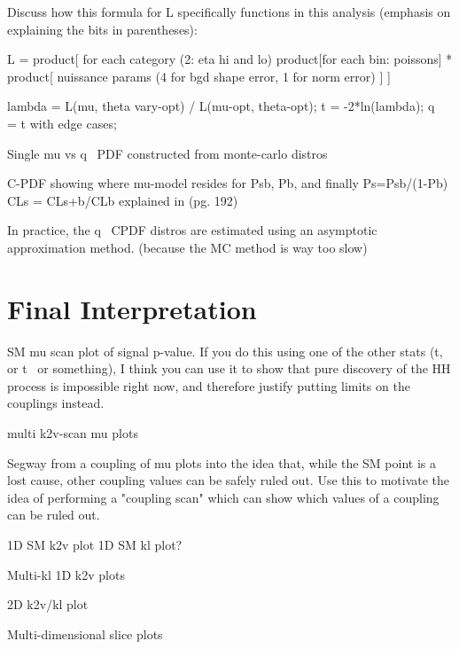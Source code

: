     Discuss how this formula for L specifically functions in this analysis
        (emphasis on explaining the bits in parentheses):

        L = product[ for each category (2: eta hi and lo) 
            product[for each bin: poissons]
            * product[ nuissance params (4 for bgd shape error, 1 for norm error) ] 
        ]
        
    lambda = L(mu, theta vary-opt) / L(mu-opt, theta-opt);
    t = -2*ln(lambda);
    q~ = t with edge cases;

    Single mu vs q~ PDF constructed from monte-carlo distros

    C-PDF showing where mu-model resides for Psb, Pb, and finally Ps=Psb/(1-Pb)
    CLs = CLs+b/CLb explained in \cite{Barlow:2019svl} (pg. 192)

    In practice, the q~ CPDF distros are estimated using an asymptotic approximation method\cite{asymptotic_formulae_for_likelihood}.
    (because the MC method is way too slow)

    

\section{Final Interpretation}

SM mu scan plot of signal p-value.
If you do this using one of the other stats (t, or t~ or something),
    I think you can use it to show that pure discovery of the HH process is impossible right now,
    and therefore justify putting limits on the couplings instead.

multi k2v-scan mu plots

Segway from a coupling of mu plots into the idea that, while the SM point is a lost cause,
    other coupling values can be safely ruled out.
Use this to motivate the idea of performing a "coupling scan"
    which can show which values of a coupling can be ruled out.

1D SM k2v plot
1D SM kl plot?

Multi-kl 1D k2v plots

2D k2v/kl plot

Multi-dimensional slice plots
